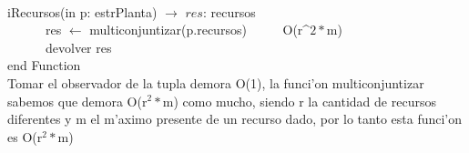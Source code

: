 \documentclass[a4paper,10pt]{article}
\begin{document}
\begin{algoritmo}
\caption{}\\
  iRecursos(in p: estrPlanta) $\rightarrow$ $res$: recursos \\
	\indent \ \ \ \ \ \  res $\gets$ multiconjuntizar(p.recursos)  \ \ \ \ \ O(r^${2}*$m)\\
	\indent \ \ \ \ \ \  devolver res    \\
   end Function \\

Tomar el observador de la tupla demora O(1), la funci'on multiconjuntizar sabemos que demora O(r$^{2}*$m) como mucho, siendo r la cantidad de recursos diferentes y m el m'aximo presente de un recurso dado, por lo tanto esta funci'on es O(r$^{2}*$m)

\end{algoritmo}
\end{document}
